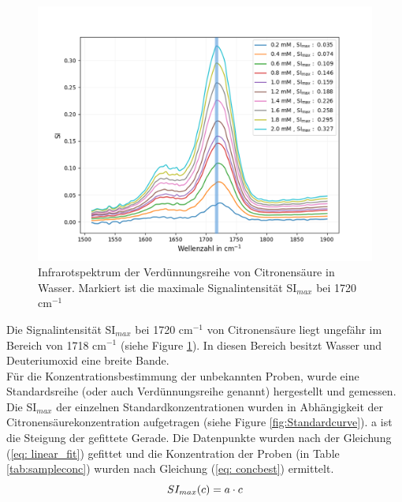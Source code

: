 \documentclass[10pt,a4paper]{article}
\begin{document}
			\begin{figure}[H]
				\centering
				\includegraphics[scale=0.65]{Standardcurve_citricacid_fit.png}
				\caption{Infrarotspektrum der Verdünnungsreihe von Citronensäure in Wasser. Markiert ist die maximale Signalintensität SI$_{max}$ bei 1720 cm$^{-1}$}
				\label{fig:IR_Standardcurve}
			\end{figure}
			
			Die Signalintensität SI$_{max}$ bei 1720 cm$^{-1}$ von Citronensäure liegt ungefähr im Bereich von 1718 cm$^{-1}$ (siehe Figure \ref{fig:IR_Standardcurve}). In diesen Bereich besitzt Wasser und Deuteriumoxid eine breite Bande.\\

			Für die Konzentrationsbestimmung der unbekannten Proben, wurde eine Standardsreihe (oder auch Verdünnungsreihe genannt) hergestellt und gemessen.\\
			Die SI$_{max}$  der einzelnen Standardkonzentrationen wurden in Abhängigkeit der Citronensäurekonzentration aufgetragen (siehe Figure \ref{fig:Standardcurve}). a ist die Steigung der gefittete Gerade. Die Datenpunkte wurden nach der Gleichung (\ref{eq: linear_fit}) gefittet und die Konzentration der Proben (in Table \ref{tab:sampleconc}) wurden nach Gleichung (\ref{eq: concbest}) ermittelt.\\

			\begin{equation}\label{eq: linear_fit}
				SI_{max} (c)= a \cdot c\\
			\end{equation}
			
\end{document}
